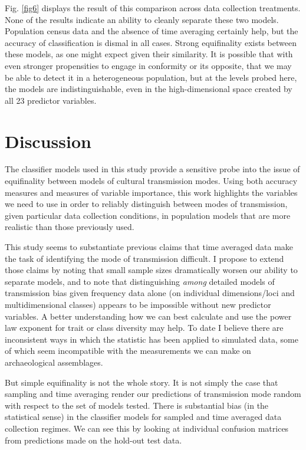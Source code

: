 Fig. \ref{fig6} displays the result of this comparison across data collection treatments.  None of the results indicate an ability to cleanly separate these two models.  Population census data and the absence of time averaging certainly help, but the accuracy of classification is dismal in all cases.  Strong equifinality exists between these models, as one might expect given their similarity.  It is possible that with even stronger propensities to engage in conformity or its opposite, that we may be able to detect it in a heterogeneous population, but at the levels probed here, the models are indistinguishable, even in the high-dimensional space created by all 23 predictor variables.  


\section{Discussion}\label{discussion}

The classifier models used in this study provide a sensitive probe into the issue of equifinality between models of cultural transmission modes.  Using both accuracy measures and measures of variable importance, this work highlights the variables we need to use in order to reliably distinguish between modes of transmission, given particular data collection conditions, in population models that are more realistic than those previously used.  

This study seems to substantiate previous claims that time averaged data make the task of identifying the mode of transmission difficult.  I propose to extend those claims by noting that small sample sizes dramatically worsen our ability to separate models, and to note that distinguishing \emph{among} detailed models of transmission bias given frequency data alone (on individual dimensions/loci and multidimensional classes) appears to be impossible without new predictor variables.  A better understanding how we can best calculate and use the power law exponent for trait or class diversity may help.  To date I believe there are inconsistent ways in which the statistic has been applied to simulated data, some of which seem incompatible with the measurements we can make on archaeological assemblages.  

But simple equifinality is not the whole story.  It is not simply the case that sampling and time averaging render our predictions of transmission mode random with respect to the set of models tested.  There is substantial bias (in the statistical sense) in the classifier models for sampled and time averaged data collection regimes.  We can see this by looking at individual confusion matrices from predictions made on the hold-out test data.

